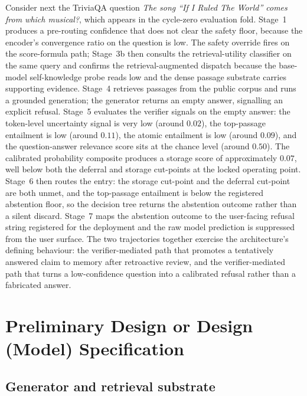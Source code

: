 Consider next the TriviaQA question \emph{The song ``If I Ruled The World'' comes from which musical?}, which appears in the cycle-zero evaluation fold. Stage~1 produces a pre-routing confidence that does not clear the safety floor, because the encoder's convergence ratio on the question is low. The safety override fires on the score-formula path; Stage~3b then consults the retrieval-utility classifier on the same query and confirms the retrieval-augmented dispatch because the base-model self-knowledge probe reads low and the dense passage substrate carries supporting evidence. Stage~4 retrieves passages from the public corpus and runs a grounded generation; the generator returns an empty answer, signalling an explicit refusal. Stage~5 evaluates the verifier signals on the empty answer: the token-level uncertainty signal is very low (around $0.02$), the top-passage entailment is low (around $0.11$), the atomic entailment is low (around $0.09$), and the question-answer relevance score sits at the chance level (around $0.50$). The calibrated probability composite produces a storage score of approximately $0.07$, well below both the deferral and storage cut-points at the locked operating point. Stage~6 then routes the entry: the storage cut-point and the deferral cut-point are both unmet, and the top-passage entailment is below the registered abstention floor, so the decision tree returns the abstention outcome rather than a silent discard. Stage~7 maps the abstention outcome to the user-facing refusal string registered for the deployment and the raw model prediction is suppressed from the user surface. The two trajectories together exercise the architecture's defining behaviour: the verifier-mediated path that promotes a tentatively answered claim to memory after retroactive review, and the verifier-mediated path that turns a low-confidence question into a calibrated refusal rather than a fabricated answer.

\section{Preliminary Design or Design (Model) Specification}
\label{sec:design-spec}



\subsection{Generator and retrieval substrate}
\label{sec:gen-retrieval}

